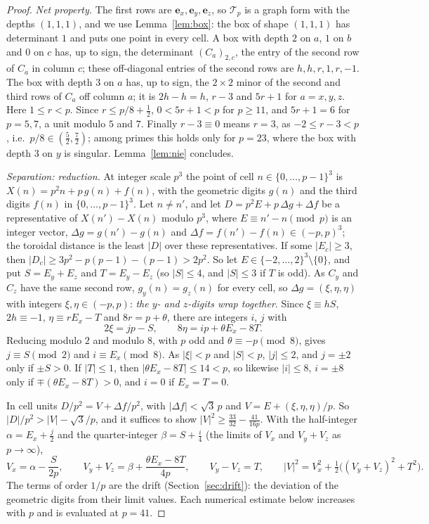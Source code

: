 \documentclass[11pt]{amsart}
\theoremstyle{definition}
\theoremstyle{plain}
\newcommand{\e}{\mathbf{e}}
\begin{document}
\begin{proof}
\emph{Net property.} The first rows are $\e_x,\e_y,\e_z$, so $\mathcal T_p$ is a graph form with the depths $(1,1,1)$, and we use Lemma~\ref{lem:box}: the box of shape $(1,1,1)$ has determinant $1$ and puts one point in every cell. A box with depth $2$ on $a$, $1$ on $b$ and $0$ on $c$ has, up to sign, the determinant $(C_a)_{2,c}$, the entry of the second row of $C_a$ in column $c$; these off-diagonal entries of the second rows are $h,h,r,1,r,-1$. The box with depth $3$ on $a$ has, up to sign, the $2\times2$ minor of the second and third rows of $C_a$ off column $a$; it is $2h-h=h$, $r-3$ and $5r+1$ for $a=x,y,z$. Here $1\le r<p$. Since $r\le p/8+\frac12$, $0<5r+1<p$ for $p\ge11$, and $5r+1=6$ for $p=5,7$, a unit modulo $5$ and $7$. Finally $r-3\equiv0$ means $r=3$, as $-2\le r-3<p$, i.e.\ $p/8\in(\frac52,\frac72)$; among primes this holds only for $p=23$, where the box with depth $3$ on $y$ is singular. Lemma~\ref{lem:nie} concludes.

\emph{Separation: reduction.} At integer scale $p^3$ the point of cell $n\in\{0,\dots,p-1\}^3$ is $X(n)=p^2n+p\,g(n)+f(n)$, with the geometric digits $g(n)$ and the third digits $f(n)$ in $\{0,\dots,p-1\}^3$. Let $n\ne n'$, and let $D=p^2E+p\,\Delta g+\Delta f$ be a representative of $X(n')-X(n)$ modulo $p^3$, where $E\equiv n'-n\pmod p$ is an integer vector, $\Delta g=g(n')-g(n)$ and $\Delta f=f(n')-f(n)\in(-p,p)^3$; the toroidal distance is the least $|D|$ over these representatives. If some $|E_c|\ge3$, then $|D_c|\ge3p^2-p(p-1)-(p-1)>2p^2$. So let $E\in\{-2,\dots,2\}^3\setminus\{0\}$, and put $S=E_y+E_z$ and $T=E_y-E_z$ (so $|S|\le4$, and $|S|\le3$ if $T$ is odd). As $C_y$ and $C_z$ have the same second row, $g_y(n)=g_z(n)$ for every cell, so $\Delta g=(\xi,\eta,\eta)$ with integers $\xi,\eta\in(-p,p)$: \emph{the $y$- and $z$-digits wrap together}. Since $\xi\equiv hS$, $2h\equiv-1$, $\eta\equiv rE_x-T$ and $8r=p+\theta$, there are integers $i$, $j$ with
\[
2\xi=jp-S,\qquad 8\eta=ip+\theta E_x-8T.
\]
Reducing modulo $2$ and modulo $8$, with $p$ odd and $\theta\equiv-p\pmod8$, gives $j\equiv S\pmod2$ and $i\equiv E_x\pmod8$. As $|\xi|<p$ and $|S|<p$, $|j|\le2$, and $j=\pm2$ only if $\pm S>0$. If $|T|\le1$, then $|\theta E_x-8T|\le14<p$, so likewise $|i|\le8$, $i=\pm8$ only if $\mp(\theta E_x-8T)>0$, and $i=0$ if $E_x=T=0$.

In cell units $D/p^2=V+\Delta f/p^2$, with $|\Delta f|<\sqrt3\,p$ and $V=E+(\xi,\eta,\eta)/p$. So $|D|/p^2>|V|-\sqrt3/p$, and it suffices to show $|V|^2\ge\frac{33}{32}-\frac{41}{16p}$. With the half-integer $\alpha=E_x+\frac j2$ and the quarter-integer $\beta=S+\frac i4$ (the limits of $V_x$ and $V_y+V_z$ as $p\to\infty$),
\[
V_x=\alpha-\frac S{2p},\qquad V_y+V_z=\beta+\frac{\theta E_x-8T}{4p},\qquad V_y-V_z=T,\qquad |V|^2=V_x^2+\tfrac12\bigl((V_y+V_z)^2+T^2\bigr).
\]
The terms of order $1/p$ are the drift (Section~\ref{sec:drift}): the deviation of the geometric digits from their limit values. Each numerical estimate below increases with $p$ and is evaluated at $p=41$.


\end{proof}
\end{document}
